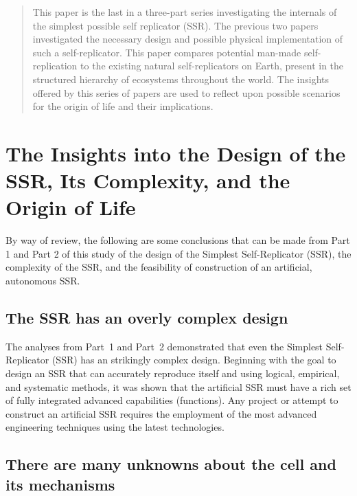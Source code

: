 
\begin{abstract}
This paper is the last in a three-part series investigating the internals 
of the simplest possible self replicator (SSR).  
The previous two papers
investigated the necessary design and possible physical implementation of 
such a self-replicator.
This paper compares potential man-made self-replication
to the existing natural self-replicators on Earth, present in the 
structured hierarchy of ecosystems throughout the world.
The insights offered by this series of papers are used to
reflect upon possible scenarios for the origin of life and their implications.
\end{abstract}


\section[Insights into the Design]{The Insights into the Design of the SSR, Its Complexity, and the Origin of Life}

By way of review, the following are some conclusions that can be made 
from Part 1 and Part 2 of this study of the design of the
Simplest Self-Replicator (SSR), the complexity of the SSR, and the feasibility of construction of
an artificial, autonomous SSR.

\subsection{The SSR has an overly complex design}

The analyses from Part~1 and Part~2 demonstrated that even the Simplest Self-Replicator (SSR)
has an strikingly complex design. 
Beginning with the goal to design an SSR that can accurately reproduce itself and using logical, empirical, and systematic methods, it was shown that the artificial 
SSR must have a rich set of fully integrated advanced
capabilities (functions).  Any project or attempt to construct an
artificial SSR requires the employment of the most advanced engineering
techniques using the latest technologies.

\subsection{There are many unknowns about the cell and its mechanisms}

